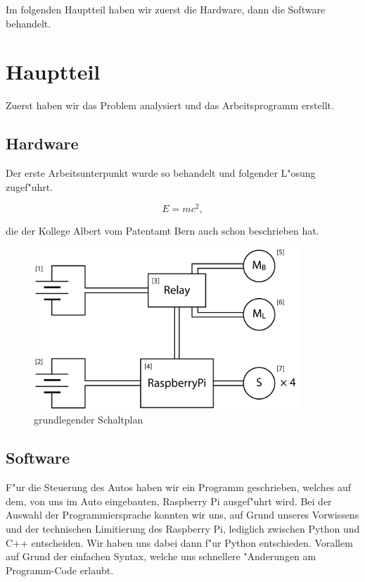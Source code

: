 \documentclass[a4paper,12pt]{article}
\begin{document}
Im folgenden Hauptteil haben wir zuerst die Hardware, dann die Software behandelt.

\section{Hauptteil}\label{sec2}

Zuerst haben wir das Problem analysiert und das Arbeitsprogramm erstellt.

\subsection{Hardware}\label{sec2.1}

Der erste Arbeitsunterpunkt wurde so behandelt und folgender L"osung zugef"uhrt.

\begin{equation}
	E = mc^2 ,
\end{equation}

die der Kollege Albert vom Patentamt Bern \cite{Alb05} auch schon beschrieben hat.

\begin{figure}[h]
	\centering
	\includegraphics[width=10cm]{./media/circuit_general.png}
	\caption{grundlegender Schaltplan}
	\label{Fig2}
\end{figure}

\subsection{Software}\label{sec2.2}

F"ur die Steuerung des Autos haben wir ein Programm geschrieben, welches auf dem, von uns im Auto eingebauten, Raspberry Pi ausgef"uhrt wird.
Bei der Auswahl der Programmiersprache konnten wir uns, auf Grund unseres Vorwissens und der technischen Limitierung des Raspberry Pi, lediglich zwischen Python und C++ entscheiden. Wir haben uns dabei dann f"ur Python entschieden.
Vorallem auf Grund der einfachen Syntax, welche uns schnellere "Anderungen am Programm-Code erlaubt.
\end{document}
